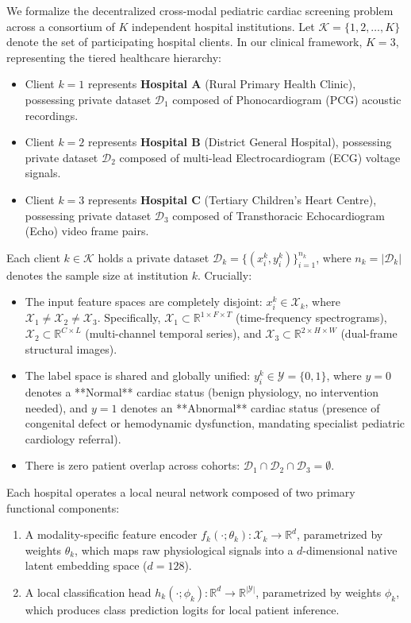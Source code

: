 \documentclass[12pt,a4paper]{amritareport}
\begin{document}
We formalize the decentralized cross-modal pediatric cardiac screening problem across a consortium of $K$ independent hospital institutions. Let $\mathcal{K} = \{1, 2, \dots, K\}$ denote the set of participating hospital clients. In our clinical framework, $K = 3$, representing the tiered healthcare hierarchy:
\begin{itemize}
	\item Client $k=1$ represents \textbf{Hospital A} (Rural Primary Health Clinic), possessing private dataset $\mathcal{D}_1$ composed of Phonocardiogram (PCG) acoustic recordings.
	\item Client $k=2$ represents \textbf{Hospital B} (District General Hospital), possessing private dataset $\mathcal{D}_2$ composed of multi-lead Electrocardiogram (ECG) voltage signals.
	\item Client $k=3$ represents \textbf{Hospital C} (Tertiary Children's Heart Centre), possessing private dataset $\mathcal{D}_3$ composed of Transthoracic Echocardiogram (Echo) video frame pairs.
\end{itemize}

Each client $k \in \mathcal{K}$ holds a private dataset $\mathcal{D}_k = \{(x_i^k, y_i^k)\}_{i=1}^{n_k}$, where $n_k = |\mathcal{D}_k|$ denotes the sample size at institution $k$. Crucially:
\begin{itemize}
	\item The input feature spaces are completely disjoint: $x_i^k \in \mathcal{X}_k$, where $\mathcal{X}_1 \neq \mathcal{X}_2 \neq \mathcal{X}_3$. Specifically, $\mathcal{X}_1 \subset \mathbb{R}^{1 \times F \times T}$ (time-frequency spectrograms), $\mathcal{X}_2 \subset \mathbb{R}^{C \times L}$ (multi-channel temporal series), and $\mathcal{X}_3 \subset \mathbb{R}^{2 \times H \times W}$ (dual-frame structural images).
	\item The label space is shared and globally unified: $y_i^k \in \mathcal{Y} = \{0, 1\}$, where $y=0$ denotes a **Normal** cardiac status (benign physiology, no intervention needed), and $y=1$ denotes an **Abnormal** cardiac status (presence of congenital defect or hemodynamic dysfunction, mandating specialist pediatric cardiology referral).
	\item There is zero patient overlap across cohorts: $\mathcal{D}_1 \cap \mathcal{D}_2 \cap \mathcal{D}_3 = \emptyset$.
\end{itemize}

Each hospital operates a local neural network composed of two primary functional components:
\begin{enumerate}
	\item A modality-specific feature encoder $f_k(\cdot; \theta_k): \mathcal{X}_k \rightarrow \mathbb{R}^{d}$, parametrized by weights $\theta_k$, which maps raw physiological signals into a $d$-dimensional native latent embedding space ($d = 128$).
	\item A local classification head $h_k(\cdot; \phi_k): \mathbb{R}^{d} \rightarrow \mathbb{R}^{|\mathcal{Y}|}$, parametrized by weights $\phi_k$, which produces class prediction logits for local patient inference.
\end{enumerate}
\end{document}
